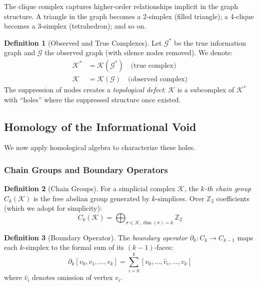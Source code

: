 \documentclass[12pt,a4paper]{article}
\theoremstyle{definition}
\newtheorem{definition}{Definition}[section]
\theoremstyle{remark}
\newcommand{\Graph}{\mathcal{G}}         %
\begin{document}
The clique complex captures higher-order relationships implicit in the graph structure. A triangle in the graph becomes a 2-simplex (filled triangle); a 4-clique becomes a 3-simplex (tetrahedron); and so on.

\begin{definition}[Observed and True Complexes]
Let $\Graph^*$ be the true information graph and $\Graph$ the observed graph (with silence nodes removed). We denote:
\begin{align}
    \mathcal{K}^* &= \mathcal{K}(\Graph^*) \quad \text{(true complex)} \\
    \mathcal{K} &= \mathcal{K}(\Graph) \quad \text{(observed complex)}
\end{align}
The suppression of nodes creates a \emph{topological defect}: $\mathcal{K}$ is a subcomplex of $\mathcal{K}^*$ with ``holes'' where the suppressed structure once existed.
\end{definition}

\subsection{Homology of the Informational Void}

We now apply homological algebra to characterize these holes.

\subsubsection{Chain Groups and Boundary Operators}

\begin{definition}[Chain Groups]
For a simplicial complex $\mathcal{K}$, the \emph{$k$-th chain group} $C_k(\mathcal{K})$ is the free abelian group generated by $k$-simplices. Over $\mathbb{Z}_2$ coefficients (which we adopt for simplicity):
\begin{equation}
    C_k(\mathcal{K}) = \bigoplus_{\sigma \in \mathcal{K}, \dim(\sigma) = k} \mathbb{Z}_2
\end{equation}
\end{definition}

\begin{definition}[Boundary Operator]
The \emph{boundary operator} $\partial_k: C_k \to C_{k-1}$ maps each $k$-simplex to the formal sum of its $(k-1)$-faces:
\begin{equation}
    \partial_k [v_0, v_1, \ldots, v_k] = \sum_{i=0}^{k} [v_0, \ldots, \hat{v}_i, \ldots, v_k]
\end{equation}
where $\hat{v}_i$ denotes omission of vertex $v_i$.
\end{definition}
\end{document}
